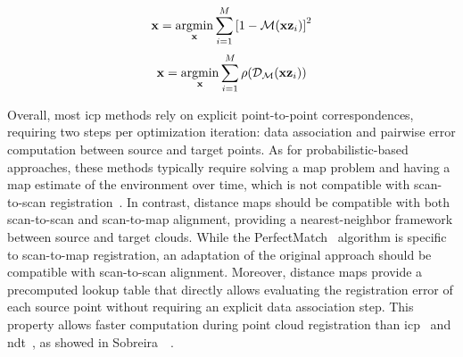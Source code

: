 \begin{equation}\label{eq:distance-maps:background:hectorslam}
\mathbf{x} = \operatorname*{argmin}_\mathbf{x} \sum_{i=1}^M
\left[ 1 - \mathcal{M}\!\left(\mathbf{x} \mathbf{z}_i\right) \right]^2
\end{equation}
\begin{equation}\label{eq:distance-maps:background:perfectmatch}
\mathbf{x} = \operatorname*{argmin}_\mathbf{x} \sum_{i=1}^M
\rho\!\left( \mathcal{D}_\mathcal{M}\!\left( \mathbf{x} \mathbf{z}_i \right) \right)
\end{equation}

Overall, most \gls{icp} methods rely on explicit point-to-point correspondences,
requiring two steps per optimization iteration: data association and
pairwise error computation between source and target points.
As for probabilistic-based approaches, these methods typically require solving a
\gls{map} problem and having a map estimate of the environment over time, which
is not compatible with scan-to-scan registration~\cite{segal:rss:2009}.
In contrast, distance maps
should be compatible with both scan-to-scan and scan-to-map alignment,
providing a nearest-neighbor framework between source and target clouds.
While the PerfectMatch~\cite{lauer:robocup:2006} algorithm is specific
to scan-to-map registration, an adaptation of the original approach
should be compatible with scan-to-scan alignment.
Moreover, distance maps provide a precomputed lookup table
that directly allows evaluating the registration error of each source point
without requiring an explicit data association step.
This property allows faster computation during point cloud registration than
\gls{icp}~\cite{besl-mckay:tpami:1992} and
\gls{ndt}~\cite{biber-strasser:iros:2003}, as showed in
Sobreira~\etal~\cite{sobreira:jint:2019}.

%
%
%

